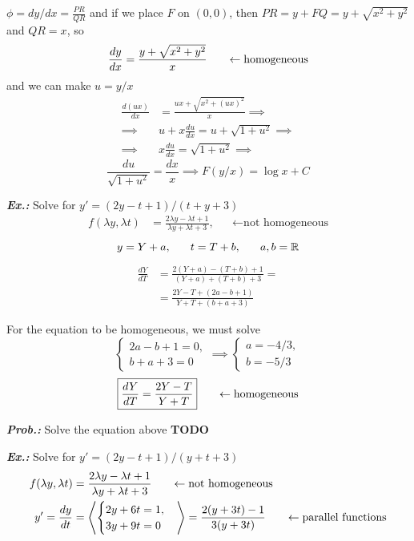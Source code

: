 \documentclass[a4paper]{article}
\begin{document}
$\phi=dy / dx=\frac{PR}{QR}$ and if we place $F$ on $(0,0)$, then $PR=y+FQ=y+\sqrt{ x^{2}+y^{2} }$ and $QR=x$, so
$$
\frac{dy}{dx}=\frac{y+\sqrt{ x^{2}+y^{2} }}{x}\hspace{4ex}\leftarrow\text{homogeneous}
$$
and we can make $u=y / x$
\begin{align}
\frac{d(ux)}{dx}&=\frac{ux+\sqrt{ x^{2}+(ux)^{2} }}{x}\implies \\
\implies&u+x \frac{du}{dx}=u+\sqrt{ 1+u^{2} }\implies \\
\implies&x \frac{du}{dx}=\sqrt{ 1+u^{2} } \implies
\end{align}
$$
\boxed{\frac{du}{\sqrt{ 1+u^{2} }}=\frac{dx}{x} \implies F(y / x)=\log x+C}
$$

\vspace{2ex}\textit{\textbf{Ex.:}} Solve for $y'=(2y-t+1) / (t+y+3)$
\begin{align}
f(\lambda y,\lambda t)&=\frac{2\lambda y-\lambda t+1}{\lambda y+\lambda t+3}, & &\leftarrow\text{not homogeneous}
\end{align}
$$
y=Y+a,\hspace{4ex}t=T+b,\hspace{4ex}a,b=\mathbb{R}
$$
\begin{align}
\frac{dY}{dT}&=\frac{2(Y+a)-(T+b)+1}{(Y+a)+(T+b)+3}= \\
&= \frac{2Y-T+(2a-b+1)}{Y+T+(b+a+3)}
\end{align}

For the equation to be homogeneous, we must solve
$$
\begin{cases}
2a-b+1=0, \\
b+a+3=0
\end{cases}\implies \begin{cases}
a=-4 / 3, \\
b=-5 / 3
\end{cases}
$$
$$
\boxed{\frac{dY}{dT}=\frac{2Y-T}{Y+T}}\hspace{4ex}\leftarrow\text{homogeneous}
$$

\vspace{2ex}\textit{\textbf{Prob.:}} Solve the equation above \textbf{TODO}

\vspace{2ex}\textit{\textbf{Ex.:}} Solve for $y'=(2y-t+1) / (y+t+3)$
\begin{align}
f(\lambda y,\lambda t)&=\frac{2\lambda y-\lambda t+1}{\lambda y+\lambda t+3}\hspace{4ex}\leftarrow\text{not homogeneous} \\
y'=\frac{dy}{dt}&=\left\langle\begin{cases}
2y+6t=1, \\
3y+9t=0
\end{cases}\right\rangle =\frac{2(y+3t)-1}{3(y+3t)} \hspace{4ex}\leftarrow\text{parallel functions}
\end{align}
\end{document}
